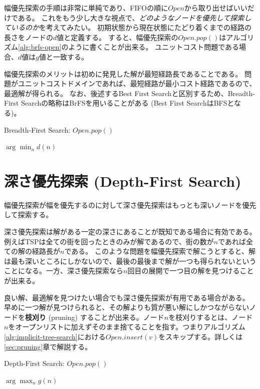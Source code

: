 \documentclass[10pt]{book}
\newcommand{\define}[2]{{\bf #1} (#2) \index{#1}\index{#2}}
\begin{document}
幅優先探索の手順は非常に単純であり、FIFOの順に$Open$から取り出せばいいだけである。
これをもう少し大きな視点で、{\it どのようなノードを優先して探索しているのか}を考えてみたい。
初期状態から現在状態にたどり着くまでの経路の長さをノードの$d$値と定義する。
すると、幅優先探索の$Open.pop()$はアルゴリズム\ref{alg:brfs-open}のように書くことが出来る。
ユニットコスト問題である場合、$d$値は$g$値と一致する。

幅優先探索のメリットは初めに発見した解が最短経路長であることである。
問題がユニットコストドメインであれば、最短経路が最小コスト経路であるので、最適解が得られる。
なお、後述するBest First Searchと区別するため、Breadth-First Searchの略称はBrFSを用いることがある (Best First SearchはBFSとなる)。

\begin{algorithm}
\caption{Breadth-First Search: $Open.pop()$}
\label{alg:brfs-open}
	\Return $\arg \min_n d(n)$
\end{algorithm}

\section{深さ優先探索 (Depth-First Search)}
\label{sec:depth-first-search}

幅優先探索が幅を優先するのに対して深さ優先探索はもっとも深いノードを優先して探索する。

深さ優先探索は解がある一定の深さにあることが既知である場合に有効である。
例えばTSPは全ての街を回ったときのみが解であるので、街の数が$n$であれば全ての解の経路長が$n$である。
このような問題を幅優先探索で解こうとすると、解は最も深いところにしかないので、最後の最後まで解が一つも得られないということになる。一方、深さ優先探索なら$n$回目の展開で一つ目の解を見つけることが出来る。

良い解、最適解を見つけたい場合でも深さ優先探索が有用である場合がある。
早めに一つ解が見つけられると、その解よりも質が悪い解にしかつながらないノードを\define{枝刈り}{pruning}することが出来る。ノード$n$を枝刈りするとは、ノード$n$をオープンリストに加えずそのまま捨てることを指す。つまりアルゴリズム\ref{alg:implicit-tree-search}における$Open.insert(v)$をスキップする。詳しくは\ref{sec:pruning}章で解説する。


\begin{algorithm}
\caption{Depth-First Search: $Open.pop()$}
\label{alg:dfs-open}
	\Return $\arg \max_n g(n)$
\end{algorithm}
\end{document}
